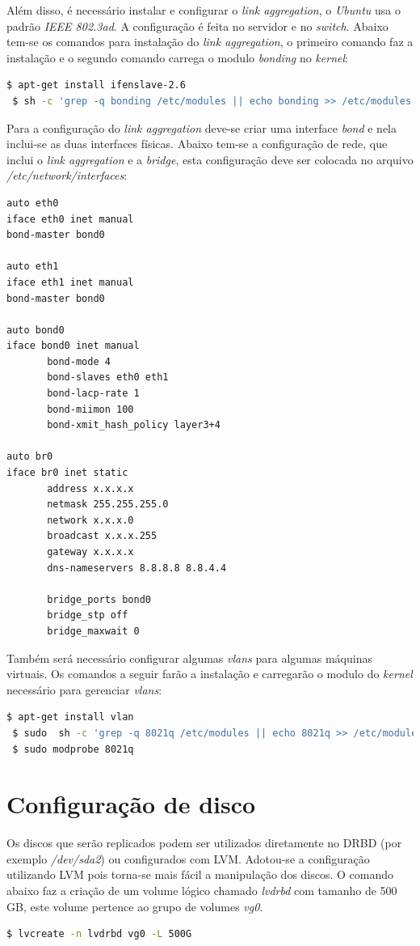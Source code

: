 Além disso, é necessário instalar e configurar o \textit{link aggregation}, o \textit{Ubuntu} usa o padrão \textit{IEEE 802.3ad}. A configuração 
é feita no servidor e no \textit{switch}. Abaixo tem-se os comandos para instalação do \textit{link aggregation}, o primeiro comando faz a 
instalação e o segundo comando carrega o modulo \textit{bonding} no \textit{kernel}:
\begin{lstlisting}[language=bash]
 $ apt-get install ifenslave-2.6
 $ sh -c 'grep -q bonding /etc/modules || echo bonding >> /etc/modules'
\end{lstlisting}

Para a configuração do \textit{link aggregation} deve-se criar uma interface \textit{bond} e nela inclui-se as duas interfaces físicas.
Abaixo tem-se a configuração de rede, que inclui o \textit{link aggregation} e a \textit{bridge}, esta configuração deve ser colocada no 
arquivo \textit{/etc/network/interfaces}:
\begin{lstlisting}
auto eth0
iface eth0 inet manual
bond-master bond0

auto eth1
iface eth1 inet manual
bond-master bond0

auto bond0
iface bond0 inet manual
       bond-mode 4
       bond-slaves eth0 eth1
       bond-lacp-rate 1
       bond-miimon 100
       bond-xmit_hash_policy layer3+4

auto br0
iface br0 inet static
       address x.x.x.x
       netmask 255.255.255.0
       network x.x.x.0
       broadcast x.x.x.255
       gateway x.x.x.x
       dns-nameservers 8.8.8.8 8.8.4.4
       
       bridge_ports bond0
       bridge_stp off
       bridge_maxwait 0
\end{lstlisting}

Também será necessário configurar algumas \textit{vlans} para algumas máquinas virtuais. Os comandos a seguir farão a instalação e carregarão
o modulo do \textit{kernel} necessário para gerenciar \textit{vlans}:
\begin{lstlisting}[language=bash]
 $ apt-get install vlan
 $ sudo  sh -c 'grep -q 8021q /etc/modules || echo 8021q >> /etc/modules'
 $ sudo modprobe 8021q
\end{lstlisting}

\section{Configuração de disco}

Os discos que serão replicados podem ser utilizados diretamente no \ac{DRBD} (por exemplo \textit{/dev/sda2}) ou configurados com \ac{LVM}. Adotou-se
a configuração utilizando \ac{LVM} pois torna-se mais fácil a manipulação dos discos. O comando abaixo faz a criação de um volume lógico chamado 
\textit{lvdrbd} com tamanho de 500 GB, este volume pertence ao grupo de volumes \textit{vg0}.
\begin{lstlisting}[language=bash]
 $ lvcreate -n lvdrbd vg0 -L 500G
\end{lstlisting}

